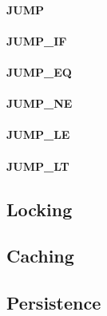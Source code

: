 \documentclass[12pt,a4paper]{article}
\begin{document}
\paragraph{JUMP}
\paragraph{JUMP\_IF}
\paragraph{JUMP\_EQ}
\paragraph{JUMP\_NE}
\paragraph{JUMP\_LE}
\paragraph{JUMP\_LT}

\subsection{Locking}\label{sec:locking}

\subsection{Caching}\label{sec:caching}

\subsection{Persistence}\label{sec:persistence}
\end{document}
